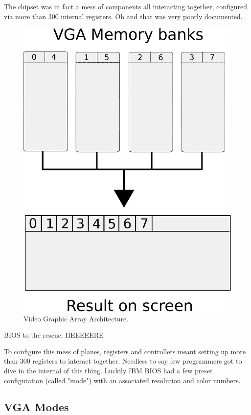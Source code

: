 \documentclass[book.tex]{subfiles}
\begin{document}
The chipset was in fact a mess of components all interacting together, configured via more than 300 internal registers. Oh and that was very poorly documented.\\
\begin{figure}[H]
\centering
\includegraphics[scale=0.5]{imgs/vga_ram_screen_layout.eps}
\caption{Video Graphic Array Architecture.}
\label{fig:vga_arch}
\end{figure}

BIOS to the rescue: HEEEEERE 
 


\bigskip
To configure this mess of planes, registers and controllers meant setting up more than 300 registers to interact together. Needless to say few programmers got to dive in the internal of this thing. Luckily IBM BIOS had a few preset configutation (called "mode") with an associated resolution and color numbers.

\subsection{VGA Modes}
\end{document}
